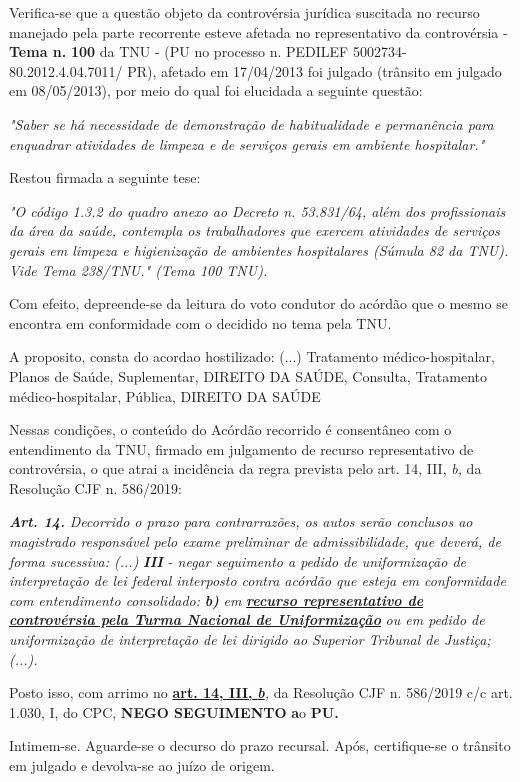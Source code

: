 \documentclass[12pt]{article}
\begin{document}
\justifying
\noindent Verifica-se que a questão objeto da controvérsia jurídica suscitada no recurso manejado pela parte recorrente esteve afetada no representativo da controvérsia - \textbf{Tema n. }\textbf{100} da TNU - (PU no processo n. PEDILEF 5002734-80.2012.4.04.7011/ PR),  afetado em 17/04/2013 foi julgado (trânsito em julgado em 08/05/2013), por meio do qual foi elucidada a seguinte questão:

\noindent \textit{"Saber se há necessidade de demonstração de habitualidade e permanência para enquadrar atividades de limpeza e de serviços gerais em ambiente hospitalar."}

\noindent Restou firmada a seguinte tese:

\noindent \textit{"O código 1.3.2 do quadro anexo ao Decreto n. 53.831/64, além dos profissionais da área da saúde, contempla os trabalhadores que exercem atividades de serviços gerais em limpeza e higienização de ambientes hospitalares (Súmula 82 da TNU). Vide Tema 238/TNU." (Tema 100 TNU).}

\noindent Com efeito, depreende-se da leitura do voto condutor do acórdão que o mesmo se encontra em conformidade com o decidido no  tema pela TNU.

\noindent A proposito, consta do acordao hostilizado: (...) Tratamento médico-hospitalar, Planos de Saúde, Suplementar, DIREITO DA SAÚDE, Consulta, Tratamento médico-hospitalar, Pública, DIREITO DA SAÚDE

\noindent Nessas condições, o conteúdo do Acórdão recorrido é consentâneo com o entendimento da TNU, firmado em julgamento de recurso representativo de controvérsia, o que atrai a incidência da regra prevista pelo art. 14, III, \textit{b,} da Resolução CJF n. 586/2019:

\noindent \textit{\textbf{Art. 14.}}\textit{ Decorrido o prazo para contrarrazões, os autos serão conclusos ao magistrado responsável pelo exame preliminar de admissibilidade, que deverá, de forma sucessiva: (...) }\textit{\textbf{III }}\textit{- negar seguimento a pedido de uniformização de interpretação de lei federal interposto contra acórdão que esteja em conformidade com entendimento consolidado: }\textit{\textbf{b)}}\textit{ em }\uline{\textit{\textbf{recurso representativo de controvérsia pela Turma Nacional de Uniformização}}}\textit{ ou em pedido de uniformização de interpretação de lei dirigido ao Superior Tribunal de Justiça;(...).}

\noindent Posto isso, com arrimo no \uline{\textbf{art. 14, III, }}\uline{\textit{\textbf{b}}}\textit{,} da Resolução CJF n. 586/2019 c/c art. 1.030, I, do CPC, \textbf{NEGO SEGUIMENTO }\textbf{a}o\textbf{ PU}\textbf{.}

\noindent Intimem-se. Aguarde-se o decurso do prazo recursal. Após, certifique-se o trânsito em julgado e devolva-se ao juízo de origem.
\end{document}
